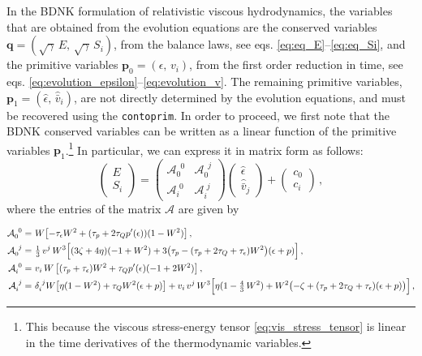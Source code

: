 \documentclass[prd,aps,twocolumn,floats,floatfix,nofootinbib,superscriptaddress] {revtex4-1}
\begin{document}
In the  BDNK formulation of relativistic viscous hydrodynamics, the variables that are obtained from the evolution equations are the conserved variables $\mathbf{q}=(\sqrt{\gamma}\,E,\,\sqrt{\gamma}\,S_i)$, from the balance laws, see eqs. \eqref{eq:eq_E}--\eqref{eq:eq_Si}, and the primitive variables $\mathbf{p}_0=(\epsilon,\,v_i)$, from the first order reduction in time, see eqs. \eqref{eq:evolution_epsilon}--\eqref{eq:evolution_v}. The remaining primitive variables, $\mathbf{p}_1=(\hat\epsilon,\,\hat{\bar v}_i)$, are not directly determined by the evolution equations, and must be recovered using the \verb|contoprim|. In order to proceed, we first note that the BDNK conserved variables can be written as a linear function of the primitive variables $\mathbf{p}_1$.\footnote{This because the viscous stress-energy tensor \eqref{eq:vis_stress_tensor} is linear in the time derivatives of the thermodynamic variables.}  In particular, we can express it in matrix form as follows:
\begin{equation}
\left(
\begin{array}{c}
E \\
S_i
\end{array}
\right) = 
\left(
\begin{array}{cc}
\mathcal{A}_{0}^{\phantom{0}0} & \mathcal{A}_{0}^{\phantom{0}j} \\
\mathcal{A}_{i}^{\phantom{i}0} & \mathcal{A}_{i}^{\phantom{i}j}
\end{array}
\right)
\left(
\begin{array}{c}
\hat\epsilon \\
\hat{\bar v}_j
\end{array}
\right) +
\left(
\begin{array}{c}
c_0 \\
c_i
\end{array}
\right)\,,
\label{eq:con2prim_gen}
\end{equation}
where the entries of the matrix $\mathcal{A}$ are given by
\begin{widetext}
\begin{align}
\mathcal{A}_{0}^{\phantom{0}0} =&~ W \bigl[- \tau_\epsilon W^2 + (\tau_p + 2 \tau_Q p'(\epsilon)) (1 -  W^2)\bigr]\,,\\
\mathcal{A}_{0}^{\phantom{0}j} = &~\tfrac{1}{3}\, v^{j} \,W^3 \Bigl[(3 \zeta + 4 \eta) (-1 + W^2) + 3 \bigl(\tau_p -  (\tau_p + 2 \tau_Q + \tau_\epsilon) W^2\bigr) (\epsilon + p)\Bigr]\,,\\
\mathcal{A}_i^{\phantom{i}0} =&~v_{i}\, W\, \bigl[(\tau_p + \tau_\epsilon) W^2 + \tau_Q p'(\epsilon) (-1 + 2 W^2)\bigr]\,,\\
\mathcal{A}_i^{\phantom{i}j} =&~\delta_i^{\phantom{i}j} W \big[\eta (1-  W^2) + \tau_Q W^2 (\epsilon + p)\big]+ v_{i} \,v^j\, W^3 \Bigl[\eta( 1-  \tfrac{4}{3}\, W^2) + W^2 \bigl(- \zeta + (\tau_p + 2 \tau_Q + \tau_\epsilon) (\epsilon + p)\bigr)\Bigr]\,,
\end{align}
\end{widetext}
\end{document}

